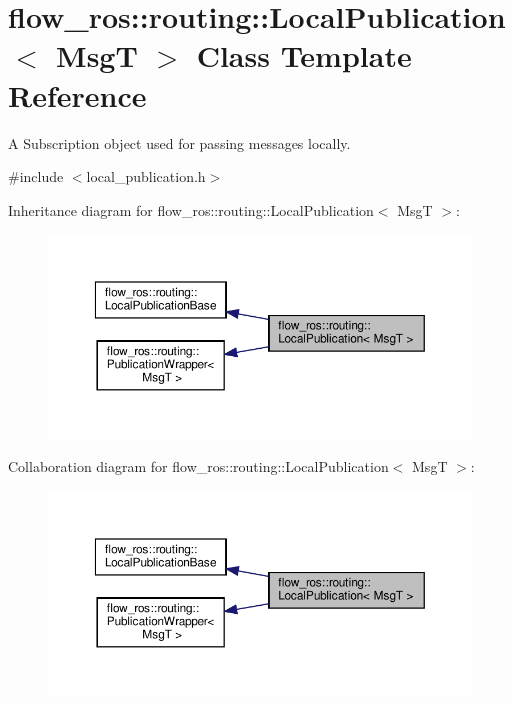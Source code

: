 \hypertarget{classflow__ros_1_1routing_1_1_local_publication}{}\section{flow\+\_\+ros\+:\+:routing\+:\+:Local\+Publication$<$ MsgT $>$ Class Template Reference}
\label{classflow__ros_1_1routing_1_1_local_publication}


A Subscription object used for passing messages locally.  




{\ttfamily \#include $<$local\+\_\+publication.\+h$>$}



Inheritance diagram for flow\+\_\+ros\+:\+:routing\+:\+:Local\+Publication$<$ MsgT $>$\+:\nopagebreak
\begin{figure}[H]
\begin{center}
\leavevmode
\includegraphics[width=350pt]{classflow__ros_1_1routing_1_1_local_publication__inherit__graph}
\end{center}
\end{figure}


Collaboration diagram for flow\+\_\+ros\+:\+:routing\+:\+:Local\+Publication$<$ MsgT $>$\+:\nopagebreak
\begin{figure}[H]
\begin{center}
\leavevmode
\includegraphics[width=350pt]{classflow__ros_1_1routing_1_1_local_publication__coll__graph}
\end{center}
\end{figure}
